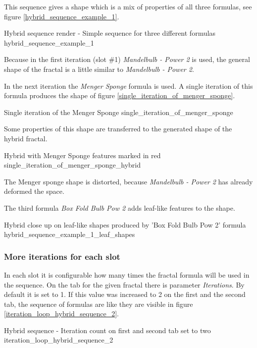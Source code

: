 This sequence gives a shape which is a mix of properties of all three
formulas, see figure \ref{hybrid_sequence_example_1}.

{Hybrid sequence render - Simple sequence for three different formulas}
{hybrid_sequence_example_1}

Because in the first iteration (slot \#1) \emph{Mandelbulb - Power 2} is used, the general shape
of the fractal is a little similar to \emph{Mandelbulb - Power 2}.

In the next iteration the \emph{Menger Sponge} formula is used. A single iteration
of this formula produces the shape of figure \ref{single_iteration_of_menger_sponge}.

{Single iteration of the Menger Sponge}
{single_iteration_of_menger_sponge}

Some properties of this shape are transferred to the generated shape of the hybrid fractal.

{Hybrid with Menger Sponge features marked in red}
{single_iteration_of_menger_sponge_hybrid}

The Menger sponge shape is distorted, because \emph{Mandelbulb - Power 2} has
already deformed the space.

The third formula \emph{Box Fold Bulb Pow 2} adds leaf-like features to the shape.

{Hybrid close up on leaf-like shapes produced by 'Box Fold Bulb Pow 2' formula}
{hybrid_sequence_example_1_leaf_shapes}

\subsubsection{More iterations for each slot}

In each slot it is configurable how many times the fractal formula will be used in the sequence.
On the tab for the given fractal there is parameter \emph{Iterations}.
By default it is set to 1. If this value was increased to 2 on the first and the second tab,
the sequence of formulas are like they are visible in figure \ref{iteration_loop_hybrid_sequence_2}. \label{two-iterations-per-slot}

{Hybrid sequence - Iteration count on first and second tab set to two}
{iteration_loop_hybrid_sequence_2}

